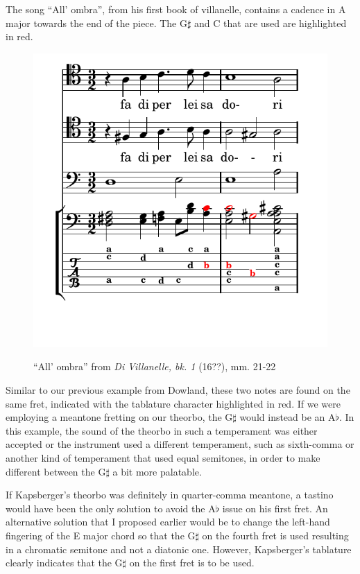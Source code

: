 The song ``All' ombra'', from his first book of villanelle, contains a cadence in A major
towards the end of the piece.  The G$\sharp$ and C that are used are highlighted in red.
\begin{figure}[h]
\centering
\includegraphics{examples/kaps_ombria.pdf}
\label{kaps-ombria}
\caption{``All' ombra'' from \textit{Di Villanelle, bk. 1} (16??), mm. 21-22 }
\end{figure}
Similar to our previous example from Dowland, these two notes are found on the same
fret, indicated with the tablature character  highlighted in red.  If we were
employing a meantone fretting on our theorbo, the G$\sharp$ would instead be an
A$\flat$. In this example, the sound of the theorbo in such a temperament was either
accepted or the instrument used a different temperament, such as sixth-comma or another
kind of temperament that used equal semitones, in order to make different between the
G$\sharp$ a bit more palatable.

If Kapsberger's theorbo was definitely in quarter-comma meantone, a tastino would have
been the only solution to avoid the A$\flat$ issue on his first fret.  An alternative
solution that I proposed earlier would be to change the left-hand fingering of the E
major chord so that the G$\sharp$ on the fourth fret is used resulting in a chromatic
semitone and not a diatonic one.  However, Kapsberger's tablature clearly indicates
that the G$\sharp$ on the first fret is to be used.

